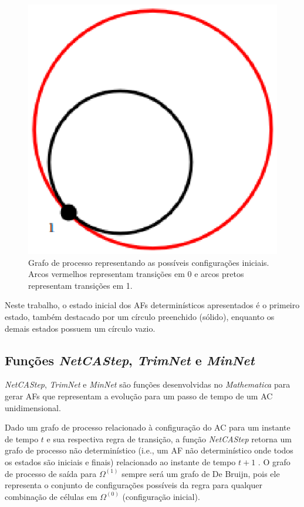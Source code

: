 \documentclass[12pt,a4paper]{article}
\begin{document}
\begin{figure}[H]
\begin{center}
\includegraphics[scale=0.3]{img/InitialConfig.eps}
\caption[Grafo de processo representando configurações iniciais]
{Grafo de processo representando as possíveis configurações
iniciais. Arcos vermelhos representam transições em 0 e arcos
pretos representam transições em 1.}
\label{fig:initconfigmathematica}
\end{center}
\end{figure}

Neste trabalho, o estado inicial dos AFs determinísticos apresentados
é o primeiro estado, também destacado por um círculo preenchido (sólido),
enquanto os demais estados possuem um círculo vazio.

\subsection{Funções \emph{NetCAStep}, \emph{TrimNet} e \emph{MinNet}}\label{sec:wolframfunctions}

\emph{NetCAStep}, \emph{TrimNet} e \emph{MinNet}  são
funções desenvolvidas no \textit{Mathematica} para gerar AFs
que representam a evolução para um passo de tempo de um AC
unidimensional.

Dado um grafo de processo relacionado à configuração do AC para
um instante de tempo $t$ e sua respectiva regra de transição,
a função \emph{NetCAStep} 
retorna um grafo de processo não determinístico (i.e., um AF
não determinístico onde todos os estados são iniciais e
finais) relacionado ao instante de tempo $t+1$
. O grafo de processo de saída para $\Omega^{(1)}$
sempre será um grafo de De Bruijn, pois ele representa o conjunto de
configurações possíveis da regra para qualquer combinação de células
em $\Omega^{(0)}$ (configuração inicial).
\end{document}
